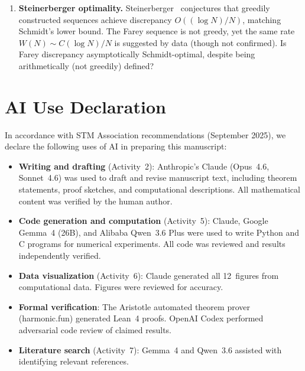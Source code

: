 \documentclass[11pt]{article}
\theoremstyle{definition}
\begin{document}
\begin{enumerate}
  \item \textbf{Steinerberger optimality.}
    Steinerberger~\cite{Steinerberger2019} conjectures that greedily
    constructed sequences achieve discrepancy $O((\log N)/N)$,
    matching Schmidt's lower bound.  The Farey sequence is not
    greedy, yet the same rate $W(N) \sim C (\log N)/N$ is suggested
    by data (though not confirmed).  Is Farey discrepancy
    asymptotically Schmidt-optimal, despite being arithmetically
    (not greedily) defined?

\end{enumerate}


\section*{AI Use Declaration}

In accordance with STM Association recommendations (September 2025),
we declare the following uses of AI in preparing this manuscript:

\begin{itemize}
\item \textbf{Writing and drafting} (Activity~2): Anthropic's Claude
  (Opus~4.6, Sonnet~4.6) was used to draft and revise manuscript text,
  including theorem statements, proof sketches, and computational descriptions.
  All mathematical content was verified by the human author.

\item \textbf{Code generation and computation} (Activity~5): Claude,
  Google Gemma~4 (26B), and Alibaba Qwen~3.6 Plus were used to write
  Python and C programs for numerical experiments.  All code was reviewed
  and results independently verified.

\item \textbf{Data visualization} (Activity~6): Claude generated all
  12~figures from computational data.  Figures were reviewed for accuracy.

\item \textbf{Formal verification}: The Aristotle automated theorem
  prover (harmonic.fun) generated Lean~4 proofs.  OpenAI Codex performed
  adversarial code review of claimed results.

\item \textbf{Literature search} (Activity~7): Gemma~4 and Qwen~3.6
  assisted with identifying relevant references.
\end{itemize}
\end{document}
